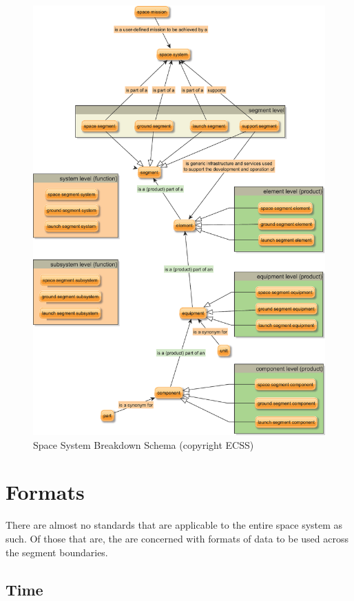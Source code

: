 \begin{figure}[h]
\centering\includegraphics[width=1.0\linewidth]{fig/system_decomposition}
\caption{Space System Breakdown Schema (copyright ECSS)}
\label{fig:Space System Breakdown Schema}
\end{figure}

\section{Formats}

There are almost no standards that are applicable to the entire space system as such. Of those that are, the are concerned with formats of data to be used across the segment boundaries.

\subsection{Time}

